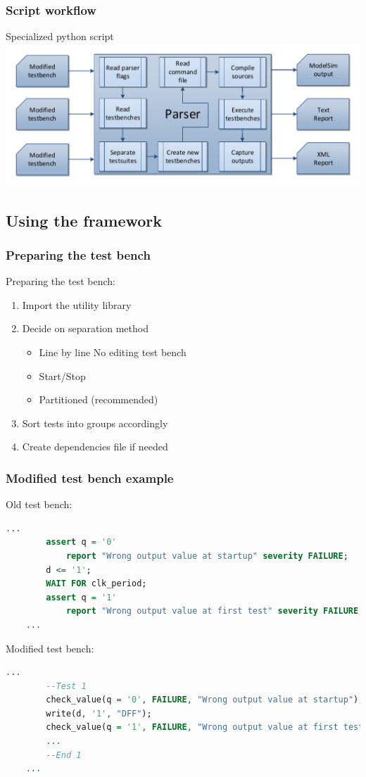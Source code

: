 \documentclass[british,10pt]{beamer}
\begin{document}
\begin{frame}\frametitle{Script workflow}
Specialized python script
\includegraphics[width=\textwidth]{images/parserwork.pdf}
\end{frame}
\subsection{Using the framework}


\begin{frame}\frametitle{Preparing the test bench}
Preparing the test bench:
\begin{enumerate}
\item Import the utility library
\item Decide on separation method
\begin{itemize}
\item Line by line  No editing test bench
\item Start/Stop
\item Partitioned (recommended)
\end{itemize}
\item Sort tests into groups accordingly
\item Create dependencies file if needed
\end{enumerate}
\end{frame}


\begin{frame}[fragile]\frametitle{Modified test bench example}
Old test bench:
\begin{lstlisting}[language=VHDL, tabsize=4, frame=single, framesep=2mm, belowskip=8pt, aboveskip=8pt, showstringspaces=false, basicstyle=\scriptsize]
	...
		assert q = '0'
			report "Wrong output value at startup" severity FAILURE;
		d <= '1';
     	WAIT FOR clk_period;
     	assert q = '1'
			report "Wrong output value at first test" severity FAILURE;
	...
\end{lstlisting}
\vskip1pt
Modified test bench:
\begin{lstlisting}[language=VHDL, tabsize=4, frame=single, framesep=2mm, belowskip=8pt, aboveskip=8pt, showstringspaces=false, basicstyle=\scriptsize]
	...
		--Test 1
		check_value(q = '0', FAILURE, "Wrong output value at startup");
		write(d, '1', "DFF");
		check_value(q = '1', FAILURE, "Wrong output value at first test");
		...
		--End 1
	...
\end{lstlisting}
\end{frame}
\end{document}
